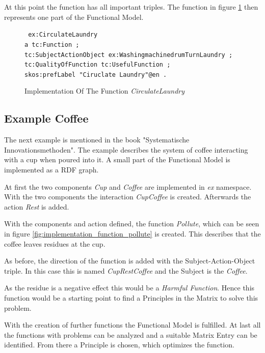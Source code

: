 At this point the function has all important triples. 
The function in figure \ref{fig:implementation_function_circulate_laundry} then represents one part of the Functional Model. 

\begin{figure}[H]
    \centering
    \begin{code}\tt
        ex:CirculateLaundry\\
        \> a tc:Function ;\\
        \> tc:SubjectActionObject ex:WashingmachinedrumTurnLaundry ;\\
        \> tc:QualityOfFunction tc:UsefulFunction ;\\
        \> skos:prefLabel "Ciruclate Laundry"@en .\\
    \end{code}
    \caption{Implementation Of The Function \textit{CirculateLaundry}}
    \label{fig:implementation_function_circulate_laundry}
\end{figure}

\subsection{Example Coffee}

The next example is mentioned in the book "Systematische  Innovationsmethoden".
The example describes the system of coffee interacting with a cup when poured into it.
A small part of the Functional Model is implemented as a RDF graph. 

At first the two components \textit{Cup} and \textit{Coffee} are implemented in \textit{ex} namespace.
With the two components the interaction \textit{CupCoffee} is created.
Afterwards the action \textit{Rest} is added.

With the components and action defined, the function \textit{Pollute}, which can be seen in figure \ref{fig:implementation_function_pollute} is created.
This describes that the coffee leaves residues at the cup. 

As before, the direction of the function is added with the Subject-Action-Object triple.
In this case this is named \textit{CupRestCoffee} and the Subject is the \textit{Coffee}. 

As the residue is a negative effect this would be a \textit{Harmful Function}.
Hence this function would be a starting point to find a Principles in the Matrix to solve this problem.

With the creation of further functions the Functional Model is fulfilled. 
At last all the functions with problems can be analyzed and a suitable Matrix Entry can be identified.
From there a Principle is chosen, which optimizes the function.

